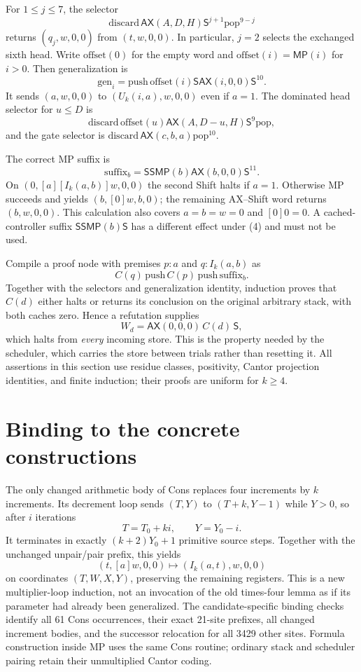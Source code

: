 \documentclass[11pt]{article}
\newcommand{\AX}{\mathsf{AX}}
\newcommand{\MP}{\mathsf{MP}}
\newcommand{\Sh}{\mathsf S}
\begin{document}
For $1\le j\le7$, the selector
\[
 \mathrm{discard}\,\AX(A,D,H)\Sh^{j+1}\mathrm{pop}^{9-j}
\]
returns $(q_j,w,0,0)$ from $(t,w,0,0)$. In particular, $j=2$ selects
the exchanged sixth head. Write $\mathrm{offset}(0)$ for the empty
word and $\mathrm{offset}(i)=\MP(i)$ for $i>0$. Then generalization is
\[
 \mathrm{gen}_i=\mathrm{push}\,\mathrm{offset}(i)\Sh
                   \AX(i,0,0)\Sh^{10}.
\]
It sends $(a,w,0,0)$ to $(U_k(i,a),w,0,0)$ even if $a=1$.
The dominated head selector for $u\le D$ is
\[
 \mathrm{discard}\,\mathrm{offset}(u)\AX(A,D-u,H)\Sh^9\mathrm{pop},
\]
and the gate selector is
$\mathrm{discard}\,\AX(c,b,a)\mathrm{pop}^{10}$.

The correct MP suffix is
\[
 \mathrm{suffix}_b=\Sh\Sh\MP(b)\AX(b,0,0)\Sh^{11}.              \tag{7}
\]
On $(0,[a][I_k(a,b)]w,0,0)$ the second Shift halts if $a=1$.
Otherwise MP succeeds and yields $(b,[0]w,b,0)$; the remaining
AX--Shift word returns $(b,w,0,0)$. This calculation also covers
$a=b=w=0$ and $[0]0=0$. A cached-controller suffix
$\Sh\Sh\MP(b)\Sh$ has a different effect under (4) and must not be used.

Compile a proof node with premises $p:a$ and $q:I_k(a,b)$ as
\[
 C(q)\,\mathrm{push}\,C(p)\,\mathrm{push}\,\mathrm{suffix}_b.
\]
Together with the selectors and generalization identity, induction
proves that $C(d)$ either halts or returns its conclusion on the original
arbitrary stack, with both caches zero. Hence a refutation supplies
\[
 W_d=\AX(0,0,0)\,C(d)\,\Sh,
\]
which halts from \emph{every} incoming store. This is the property
needed by the scheduler, which carries the store between trials rather
than resetting it. All assertions in this section use residue classes,
positivity, Cantor projection identities, and finite induction; their
proofs are uniform for $k\ge4$.

\section{Binding to the concrete constructions}
The only changed arithmetic body of Cons replaces four increments by
$k$ increments. Its decrement loop sends $(T,Y)$ to $(T+k,Y-1)$ while
$Y>0$, so after $i$ iterations
\[
 T=T_0+ki,\qquad Y=Y_0-i.
\]
It terminates in exactly $(k+2)Y_0+1$ primitive source steps. Together
with the unchanged unpair/pair prefix, this yields
\[
 (t,[a]w,0,0)\longmapsto(I_k(a,t),w,0,0)
\]
on coordinates $(T,W,X,Y)$, preserving the remaining registers.
This is a new multiplier-loop induction, not an invocation of the
old times-four lemma as if its parameter had already been generalized.
The candidate-specific binding checks identify all 61 Cons occurrences,
their exact 21-site prefixes, all changed increment bodies, and the
successor relocation for all 3429 other sites. Formula construction
inside MP uses the same Cons routine; ordinary stack and scheduler
pairing retain their unmultiplied Cantor coding.
\end{document}
